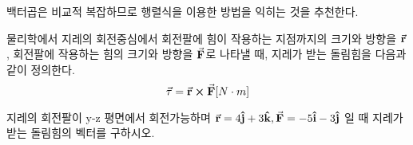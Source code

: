 \begin{flushleft}
백터곱은 비교적 복잡하므로 행렬식을 이용한 방법을 익히는 것을 추천한다. 



\begin{task}
물리학에서 지레의 회전중심에서 회전팔에 힘이 작용하는 지점까지의 크기와 방향을 $\va{r}$, 회전팔에 작용하는 힘의 
크기와 방향을 $\va{F}$로 나타낼 때, 지레가 받는 돌림힘을 다음과 같이 정의한다. 
\begin{equation}
  \vec{\tau}= \va{r} \cross \va{F} [N\cdot m]
\end{equation} 

지레의 회전팔이 y-z 평면에서 회전가능하며 $\va{r} =4\vu{j}+3\vu{k},  \va{F} =-5\vu{i} -3\vu{j}$ 일 때 지레가 받는
돌림힘의 벡터를 구하시오. 
\end{task}
\end{flushleft}

